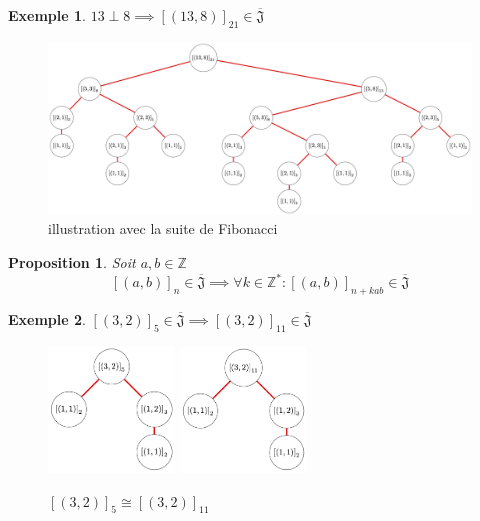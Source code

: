 \documentclass{article}
\newtheorem{proposition}{Proposition}
\newtheorem{example}{Exemple}
\begin{document}
\begin{example}
    $13 \perp 8 \implies {[(13, 8)]}_{21} \in \overline{\mathfrak{J}}$
\end{example}
\begin{figure}[h]
    \caption{illustration avec la suite de Fibonacci}
    \centering
    \includegraphics[width=\textwidth]{fibo}
\end{figure}

\begin{proposition}
    Soit $a, b \in \mathbb{Z}$
    \[ 
        {[(a, b)]}_n \in \overline{\mathfrak{J}} \implies
        \forall k \in \mathbb{Z}^*: {[(a, b)]}_{n+kab} \in \overline{\mathfrak{J}}
    \]
\end{proposition}

\begin{example}
    ${[(3, 2)]}_5 \in \overline{\mathfrak{J}} \implies {[(3, 2)]}_{11} \in \overline{\mathfrak{J}}$
\end{example}

\begin{figure}[h]
    \caption{${[(3, 2)]}_5 \cong {[(3, 2)]}_{11}$}
    \centering
    \includegraphics[width=0.3\textwidth]{532}
    \includegraphics[width=0.3\textwidth]{11_3_2}
\end{figure}
\end{document}
